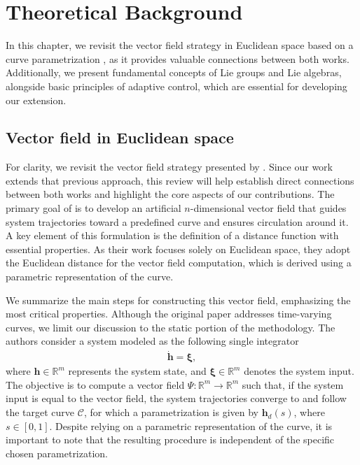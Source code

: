 \chapter{Theoretical Background}\label{ch:background}
In this chapter, we revisit the vector field strategy in Euclidean space based on a curve parametrization \citep{Rezende2022}, as it provides valuable connections between both works. Additionally, we present fundamental concepts of Lie groups and Lie algebras, alongside basic principles of adaptive control, which are essential for developing our extension.

\section{Vector field in Euclidean space}\label{sec:adriano-review}
For clarity, we revisit the vector field strategy presented by \citet{Rezende2022}. Since our work extends that previous approach, this review will help establish direct connections between both works and highlight the core aspects of our contributions. The primary goal of \citet{Rezende2022} is to develop an artificial $n$-dimensional vector field that guides system trajectories toward a predefined curve and ensures circulation around it. A key element of this formulation is the definition of a distance function with essential properties. As their work focuses solely on Euclidean space, they adopt the Euclidean distance for the vector field computation, which is derived using a parametric representation of the curve.

We summarize the main steps for constructing this vector field, emphasizing the most critical properties. Although the original paper addresses time-varying curves, we limit our discussion to the static portion of the methodology. The authors consider a system modeled as the following single integrator 
\begin{align}
    \dot{\mathbf{h}} = \boldsymbol{\xi}, \label{eq:adriano-single-integrator}
\end{align}
where $\mathbf{h}\in\mathbb{R}^m$ represents the system state, and $\boldsymbol{\xi}\in\mathbb{R}^m$ denotes the system input. The objective is to compute a vector field $\Psi:\mathbb{R}^m\to\mathbb{R}^m$ such that, if the system input is equal to the vector field, the system trajectories converge to and follow the target curve $\mathcal{C}$, for which a parametrization is given by $\mathbf{h}_d(s)$, where $s\in[0,1]$. Despite relying on a parametric representation of the curve, it is important to note that the resulting procedure is independent of the specific chosen parametrization.

